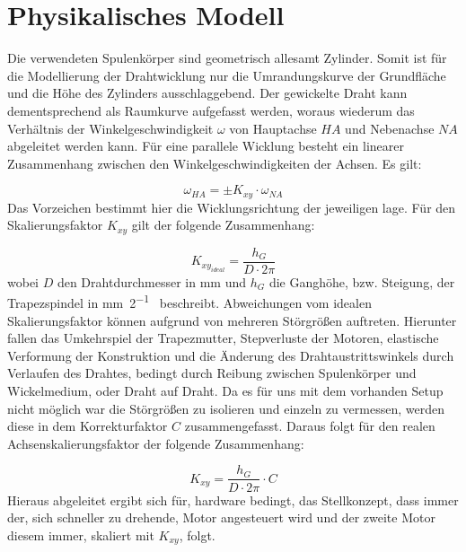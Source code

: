 \section{Physikalisches Modell}
\label{sec:Physikalisches Modell}


Die verwendeten Spulenkörper sind geometrisch allesamt Zylinder. Somit ist für die Modellierung der Drahtwicklung nur die Umrandungskurve der Grundfläche und die Höhe des Zylinders ausschlaggebend. Der gewickelte Draht kann dementsprechend als Raumkurve aufgefasst werden, woraus wiederum das Verhältnis der Winkelgeschwindigkeit $\omega$ von Hauptachse $HA$ und Nebenachse $NA$ abgeleitet werden kann. Für eine parallele Wicklung besteht ein linearer Zusammenhang zwischen den Winkelgeschwindigkeiten der Achsen. Es gilt:

\begin{equation}
    \omega_{HA} = \pm K_{xy} \cdot \omega_{NA}
\end{equation}
Das Vorzeichen bestimmt hier die Wicklungsrichtung der jeweiligen lage. Für den Skalierungsfaktor $K_{xy}$ gilt der folgende Zusammenhang:

\begin{equation}
    \label{eq:achsenskalierungsfaktor}
    K_{xy_{ideal}} = \frac{h_G}{D \cdot 2\pi} 
\end{equation}
wobei $D$ den Drahtdurchmesser in \si{\milli\metre} und $h_G$ die Ganghöhe, bzw. Steigung, der Trapezspindel in \si{\milli\metre\per 2\pi} beschreibt. Abweichungen vom idealen Skalierungsfaktor können aufgrund von mehreren Störgrößen auftreten. Hierunter fallen das Umkehrspiel der Trapezmutter, Stepverluste der Motoren, elastische Verformung der Konstruktion und die Änderung des Drahtaustrittswinkels durch Verlaufen des Drahtes, bedingt durch Reibung zwischen Spulenkörper und Wickelmedium, oder Draht auf Draht. Da es für uns mit dem vorhanden Setup nicht möglich war die Störgrößen zu isolieren und einzeln zu vermessen, werden diese in dem Korrekturfaktor $C$ zusammengefasst. Daraus folgt für den realen Achsenskalierungsfaktor der folgende Zusammenhang:

\begin{equation}
    \label{eq:achsenskalierungsfaktor_real}
    K_{xy} = \frac{h_G}{D \cdot 2\pi} \cdot C
\end{equation}
Hieraus abgeleitet ergibt sich für, hardware bedingt, das Stellkonzept, dass immer der, sich schneller zu drehende, Motor angesteuert wird und der zweite Motor diesem immer, skaliert mit $K_{xy}$, folgt. \newline \newline



